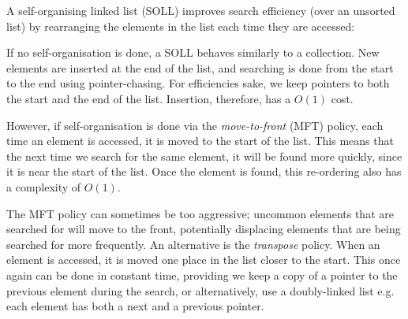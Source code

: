 
A self-organising linked list (SOLL) improves search efficiency (over
an unsorted list) by rearranging the elements in the list each time they
are accessed: 


If no self-organisation is done, a SOLL behaves similarly to a collection.
New elements are inserted at the end of the list, and searching is done
from the start to the end using pointer-chasing.  For efficiencies sake,
we keep pointers to both the start and the end of the list. Insertion,
therefore, has a $O(1)$ cost.

However, if self-organisation is done via the {\it move-to-front} (MFT)
policy, each time an element is accessed, it is moved to the start of the
list. This means that the next time we search for the same element, it
will be found more quickly, since it is near the start of the list. Once
the element is found, this re-ordering also has a complexity of $O(1)$.

The MFT policy can sometimes be too aggressive; uncommon elements that
are searched for will move to the front, potentially displacing elements that
are being searched for more frequently. An alternative is the
{\it transpose} policy. When an element is accessed, it is moved one
place in the list closer to the start. This once again can be done in
constant time, providing we keep a copy of a pointer to the previous
element during the search, or alternatively, use a doubly-linked list
e.g. each element has both a next and a previous pointer.


